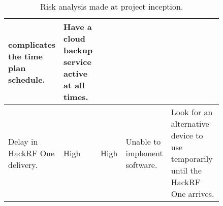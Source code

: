 \begin{table}[H]
\begin{tabular}{|p{0.15\linewidth}|
                   p{0.14\linewidth}|
                   p{0.1\linewidth}|
                   p{0.15\linewidth}|
                   p{0.30\linewidth}|}
                                        complicates the time plan
                                        schedule.
                                               & Have a cloud backup
                                                 service active at all
                                                 times. \\
    \hline
    Delay in HackRF One delivery.
                & High       & High   & Unable to implement software.
                                               & Look for an
                                                 alternative device to
                                                 use temporarily until
                                                 the HackRF One
                                                 arrives. \\
    \hline
  \end{tabular}
  \caption{Risk analysis made at project inception.}
  \label{tab:risk_analysis}
\end{table}
\begin{comment}
  #+ORGTBL: SEND risk_analysis orgtbl-to-latex :splice t
  |-------------+------------+--------+-------------+-------------------------|
  | <11>        | <10>       | <6>    | <11>        | <23>                    |
  | Description | Likelihood | Impact | Result      | Prevention              |
  |-------------+------------+--------+-------------+-------------------------|
  | Writing the report could take longer than expected. | Medium     | Medium | The report will be handed in incomplete. | Multiple draft reports should be handed in during the last milestone. Some sections of the report can be written in parallel to the coding in previous milestones. |
  |-------------+------------+--------+-------------+-------------------------|
  | Time consumption of each milestones may be wrongly estimated. | High       | Medium | What was meant to be done in a specific milestone may not be complete. | Continue to the next milestone and if time allows it return back to the incomplete one and finish it. |
  |-------------+------------+--------+-------------+-------------------------|
  | Illness     | Low        | Medium | Tasks may be more time consuming. | None                    |
  |-------------+------------+--------+-------------+-------------------------|
  | Physical damage to- or theft of laptop. | Low        | High   | Loss of work that in turn complicates the time plan schedule. | Have a cloud backup service active at all times. |
  |-------------+------------+--------+-------------+-------------------------|
  | Delay in HackRF One delivery. | High       | High   | Unable to implement software. | Look for an alternative device to use temporarily until the HackRF One arrives. |
  |-------------+------------+--------+-------------+-------------------------|
\end{comment}

